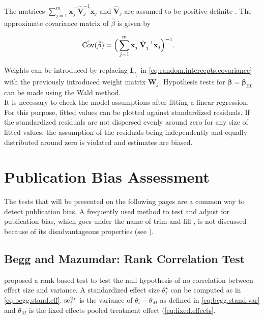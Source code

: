 \documentclass[11pt,a4paper,twoside]{book}\usepackage[]{graphicx}\usepackage[]{color}
\begin{document}
The matrices $\sum_{j = 1}^m \mathbf{x}_j^\top \hat{\mathbf{V}}_j^{-1} \mathbf{x}_j$ and $\hat{\mathbf{V}}_j$ are assumed to be positive definite  . The approximate covariance matrix of $\hat{\beta}$ is given by

\begin{align}
\hat{\operatorname{Cov}}(\hat{\beta}) &= \Big( \sum_{j = 1}^m \mathbf{x}_j^\top \hat{\mathbf{V}}_j^{-1} \mathbf{x}_j \Big)^{-1}. \nonumber
\end{align}

Weights can be introduced by replacing $\mathbf{I}_{n_j}$ in \eqref{eq:random.intercepts.covariance} with the previously introduced weight matrix $\mathbf{W}_j$. Hypothesis tests for $\boldsymbol{\beta}= \boldsymbol{\beta}_\textrm{H0}$ can be made using the Wald method. \\
It is necessary to check the model assumptions after fitting a linear regression. For this purpose, fitted values can be plotted against standardized residuals. If the standardized residuals are not dispersed evenly around zero for any size of fitted values, the assumption of the residuals being independently and equally distributed around zero is violated and estimates are biased. \\




\section{Publication Bias Assessment}
The tests that will be presented on the following pages are a common way to detect publication bias. A frequently used method to test and adjust for publication bias, which goes under the name of trim-and-fill \citep{trimfill}, is not discussed because of its disadvantageous properties (see \eg \citealp{Moreno.2009}).\\

\subsection{Begg and Mazumdar: Rank Correlation Test} \label{sec:Begg}
\citet{Begg} proposed a rank based test to test the null hypothesis of no correlation between effect size and variance.
A standardized effect size $\theta_i^\star$ can be computed as in \eqref{eq:begg.stand.eff}. $\operatorname{se}_i^{2\star}$ is the variance of $\theta_i - \theta_M$ as defined in \eqref{eq:begg.stand.var} and $\theta_M$ is the fixed effects pooled treatment effect (\eqref{eq:fixed.effects}. 
\end{document}
